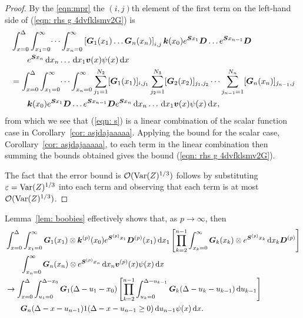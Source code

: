 \begin{proof}
	By the \ref{eqn:mpr} the \((i,j)\)th element of the first term on the left-hand side of (\ref{eqn: rhs g 4dvfklsmv2G}) is 
	\begin{align}
		&\int_{x=0}^\Delta \int_{x_1=0}^\infty \dots \int_{x_n=0}^\infty \left[\boldsymbol G_1(x_1)\dots \boldsymbol G_n(x_n)\right]_{i,j} \boldsymbol k(x_0) e^{\boldsymbol{S}x_1} \boldsymbol D \dots 
		e^{\boldsymbol{S}x_{n-1}} \boldsymbol D \nonumber
		\\&\qquad{} e^{\boldsymbol{S}x_n} \, \mathrm{d} x_n \dots \, \mathrm{d} x_1 {\boldsymbol v}(x) \psi(x) \, \mathrm{d} x \nonumber 
		\\&= \int_{x=0}^\Delta \int_{x_1=0}^\infty \dots \int_{x_n=0}^\infty \sum_{j_1=1}^{N_2}[\boldsymbol G_1(x_1)]_{i,j_1}\sum_{j_2=1}^{N_3}[\boldsymbol G_2(x_2)]_{j_1,j_2}\dots \sum_{j_{n-1}=1}^{N_n} [\boldsymbol G_n(x_n)]_{j_{n-1},j} \nonumber
		\\&\qquad{} \boldsymbol k(x_0) e^{\boldsymbol{S}x_1} \boldsymbol D  \dots
		e^{\boldsymbol{S}x_{n-1}} \boldsymbol D 
		e^{\boldsymbol{S}x_n} \, \mathrm{d} x_n \dots \, \mathrm{d} x_1 {\boldsymbol v}(x) \psi(x) \, \mathrm{d} x, \label{eqn: s}
	\end{align}
	from which we see that (\ref{eqn: s}) is a linear combination of the scalar function case in Corollary~\ref{cor: asjdajaaaaa}. Applying the bound for the scalar case, Corollary~\ref{cor: asjdajaaaaa}, to each term in the linear combination then summing the bounds obtained gives the bound (\ref{eqn: rhs g 4dvfklsmv2G}). 

	The fact that the error bound is \(\mathcal O(\mathrm{Var}(Z)^{1/3})\) follows by substituting \(\varepsilon=\mathrm{Var}(Z)^{1/3}\) into each term and observing that each term is at most \(\mathcal O(\mathrm{Var}(Z)^{1/3})\). 
\end{proof}
Lemma~\ref{lem: boobies} effectively shows that, as \(p \to \infty\), then 
\begin{align}
	& \int_{x=0}^\Delta \int_{x_1=0}^\infty \bs G_1(x_1) \otimes \bs k^{(p)} (x_0) e^{\bs{S}^{(p)}x_1} \bs D^{(p)} (x_1) \wrt x_1
	\left[\prod_{k=2}^{n-1}\int_{x_k=0}^\infty \bs G_{k }(x_k) \otimes e^{\bs{S}^{(p)}x_k} \wrt x_k \bs D^{(p)}\right] \nonumber
\\&\qquad{}\int_{x_n=0}^\infty \bs G_{n }(x_n)\otimes e^{\bs{S}^{(p)}x_n} \wrt x_n {\bs v}^{(p)}(x) \psi(x) \wrt x \nonumber 
%
	\\&{}\to \int_{x=0}^\Delta \int_{u_1=0}^{\Delta-x_0}\bs G_1(\Delta - u_1 - x_0)
	\left[\prod_{k=2}^{n-1} \int_{u_k=0}^{\Delta-u_{k-1}} \bs G_{k}(\Delta-u_k-u_{k-1})\wrt u_{k-1}\right] \nonumber 
			\\&\qquad{} \bs G_{n }(\Delta - x-u_{n-1})
		1(\Delta-x-u_{n-1}\geq0) \wrt u_{n-1}\psi(x) \wrt x \nonumber.
\end{align}


